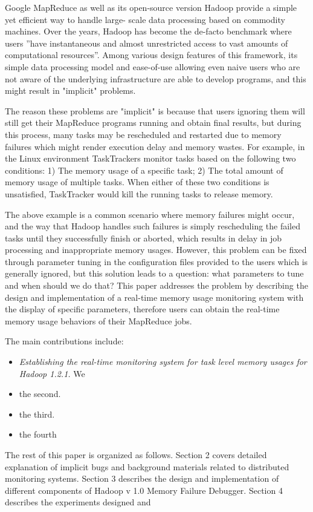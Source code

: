 Google MapReduce as well as its open-source version Hadoop provide a simple yet efficient way to handle large- scale data processing based on commodity machines.
Over the years, Hadoop has become the de-facto benchmark\cite{hayashibara2004varphi} where users ”have instantaneous and almost unrestricted access to vast amounts of computational resources”.
Among various design features of this framework, its simple data processing model and ease-of-use allowing even naive users who are not aware of the underlying infrastructure are able to develop programs, and this might result in "implicit" problems.
\par
The reason these problems are "implicit" is because that users ignoring them will still get their MapReduce programs running and obtain final results, but during this process, many tasks may be rescheduled and restarted due to memory failures which might render execution delay and memory wastes. 
For example, in the Linux environment TaskTrackers monitor tasks based on the following two conditions:  1) The memory usage of a specific task; 2) The total amount of memory usage of multiple tasks. When either of these two conditions is unsatisfied, TaskTracker would kill the running tasks to release memory.
\par

The above example is a common scenario where memory failures might occur, and the way that Hadoop handles such failures is simply rescheduling the failed tasks until they successfully finish or aborted, which results in delay in job processing and inappropriate memory usages.
However, this problem can be fixed through parameter tuning in the configuration files provided to the users which is generally ignored, but this solution leads to a question: what parameters to tune and when should we do that? 
This paper addresses the problem by describing the design and implementation of a real-time memory usage monitoring system with the display of specific parameters, therefore users can obtain the real-time memory usage behaviors of their MapReduce jobs.
\par
The main contributions include:
\begin{itemize}
	\setlength{\itemsep}{0pt}
	 \setlength{\parskip}{0pt}
	 \setlength{\parsep}{0pt}
	\item
		\emph{ Establishing the real-time monitoring system for task level memory usages for Hadoop 1.2.1.} We
	\item
		the second.
	\item
		the third.
	\item
		the fourth
\end{itemize}

The rest of this paper is organized as follows. Section 2 covers detailed explanation of implicit bugs and background materials related to distributed monitoring systems. Section 3 describes the design and implementation of different components of Hadoop v 1.0 Memory Failure Debugger. Section 4 describes the experiments designed and 


